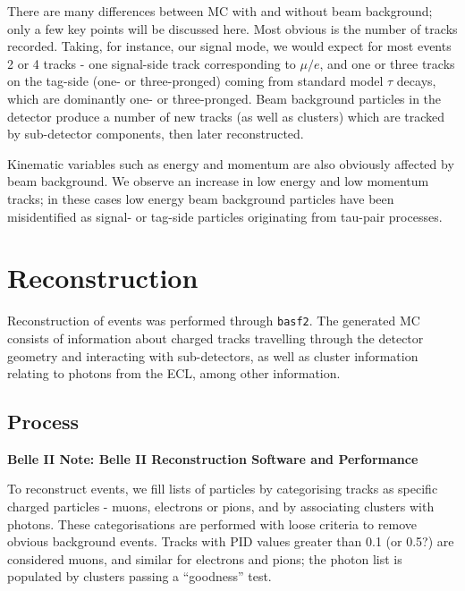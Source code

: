 \documentclass[12pt]{thesis}  %
\begin{document}
    
    
    
There are many differences between MC with and without beam background; only a few key points will be discussed here. Most obvious is the number of tracks recorded. Taking, for instance, our signal mode, we would expect for most events 2 or 4 tracks - one signal-side track corresponding to $\mu/e$, and one or three tracks on the tag-side (one- or three-pronged) coming from standard model $\tau$ decays, which are dominantly one- or three-pronged. Beam background particles in the detector produce a number of new tracks (as well as clusters) which are tracked by sub-detector components, then later reconstructed.

Kinematic variables such as energy and momentum are also obviously affected by beam background. We observe an increase in low energy and low momentum tracks; in these cases low energy beam background particles have been misidentified as signal- or tag-side particles originating from tau-pair processes.





\pagebreak

\chapter{Reconstruction}

Reconstruction of events was performed through \texttt{basf2}. The generated MC consists of information about charged tracks travelling through the detector geometry and interacting with sub-detectors, as well as cluster information relating 
to photons from the ECL, among other information. 


\section{Process}

\textbf{Belle II Note: Belle II Reconstruction Software and Performance}

To reconstruct events, we fill lists of particles by categorising tracks as specific charged particles - muons, electrons or pions, and by associating clusters with photons. These categorisations are performed with loose criteria to remove obvious background events. Tracks with PID values greater than 0.1 (or 0.5?) are considered muons, and similar for electrons and pions; the photon list is populated by clusters passing a ``goodness'' test. 
\end{document}
